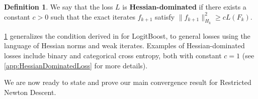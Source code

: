 \documentclass{article}
\theoremstyle{plain}
\theoremstyle{definition}
\newtheorem{definition}[theorem]{Definition}
\theoremstyle{remark}
\begin{document}
\begin{definition}\label{defHessianDominatedLoss}
    We say that the loss $L$ is \textbf{Hessian-dominated} if there exists a constant $c>0$ such that the exact iterates $f_{k+1}$ satisfy $\|f_{k+1}\|^2_{H_k} \geq c L(F_k)$.
\end{definition}

\cref{defHessianDominatedLoss} generalizes the condition derived in \citep[Theorem 4]{2014AConvergenceRateAnalysisForLogitBoostMARTAndTheirVariant} for LogitBoost, to general losses using the language of Hessian norms and weak iterates. Examples of Hessian-dominated losses include binary and categorical cross entropy, both with constant $c=1$ (see \cref{app:HessianDominatedLoss} for more details).

We are now ready to state and prove our main convergence result for Restricted Newton Descent.
\end{document}
